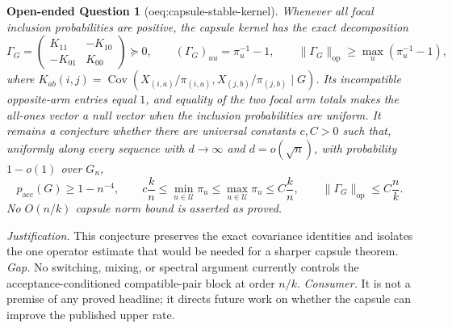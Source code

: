 \documentclass{article}
\newtheorem{openendedquestion}{Open-ended Question}
\begin{document}
\begin{openendedquestion}[oeq:capsule-stable-kernel]\label{oeq:capsule-stable-kernel}
Whenever all focal inclusion probabilities are positive, the capsule kernel has the exact decomposition
\[
\Gamma_G=
\begin{pmatrix}K_{11}&-K_{10}\\-K_{01}&K_{00}\end{pmatrix}\succeq0,
\qquad
(\Gamma_G)_{uu}=\pi_u^{-1}-1,
\qquad
\|\Gamma_G\|_{\mathrm{op}}\ge\max_u(\pi_u^{-1}-1),
\]
where \(K_{ab}(i,j)=\operatorname{Cov}(X_{(i,a)}/\pi_{(i,a)},X_{(j,b)}/\pi_{(j,b)}\mid G)\).  Its incompatible opposite-arm entries equal \(1\), and equality of the two focal arm totals makes the all-ones vector a null vector when the inclusion probabilities are uniform.  It remains a conjecture whether there are universal constants \(c,C>0\) such that, uniformly along every sequence with \(d\to\infty\) and \(d=o(\sqrt n)\), with probability \(1-o(1)\) over \(G_n\),
\[
p_{\mathrm{acc}}(G)\ge1-n^{-4},
\qquad
c\frac{k}{n}\le\min_{u\in\mathcal U}\pi_u
\le\max_{u\in\mathcal U}\pi_u\le C\frac{k}{n},
\qquad
\|\Gamma_G\|_{\mathrm{op}}\le C\frac{n}{k}.
\]
No \(O(n/k)\) capsule norm bound is asserted as proved.
\end{openendedquestion}
\par\smallskip\noindent \textit{Justification.} This conjecture preserves the exact covariance identities and isolates the one operator estimate that would be needed for a sharper capsule theorem. \textit{Gap.} No switching, mixing, or spectral argument currently controls the acceptance-conditioned compatible-pair block at order \(n/k\). \textit{Consumer.} It is not a premise of any proved headline; it directs future work on whether the capsule can improve the published upper rate.
\end{document}
